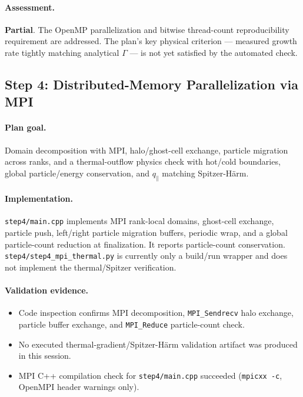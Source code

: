 \documentclass[11pt,a4paper]{article}
\begin{document}
\paragraph{Assessment.}
\textbf{Partial}. The OpenMP parallelization and bitwise thread-count reproducibility requirement are addressed. The plan's key physical criterion --- measured growth rate tightly matching analytical $\Gamma$ --- is not yet satisfied by the automated check.

\subsection{Step 4: Distributed-Memory Parallelization via MPI}

\paragraph{Plan goal.}
Domain decomposition with MPI, halo/ghost-cell exchange, particle migration across ranks, and a thermal-outflow physics check with hot/cold boundaries, global particle/energy conservation, and $q_\parallel$ matching Spitzer-H\"arm.

\paragraph{Implementation.}
\texttt{step4/main.cpp} implements MPI rank-local domains, ghost-cell exchange, particle push, left/right particle migration buffers, periodic wrap, and a global particle-count reduction at finalization. It reports particle-count conservation. \texttt{step4/step4\_mpi\_thermal.py} is currently only a build/run wrapper and does not implement the thermal/Spitzer verification.

\paragraph{Validation evidence.}
\begin{itemize}[leftmargin=*]
  \item Code inspection confirms MPI decomposition, \texttt{MPI\_Sendrecv} halo exchange, particle buffer exchange, and \texttt{MPI\_Reduce} particle-count check.
  \item No executed thermal-gradient/Spitzer-H\"arm validation artifact was produced in this session.
  \item MPI C++ compilation check for \texttt{step4/main.cpp} succeeded (\texttt{mpicxx -c}, OpenMPI header warnings only).
\end{itemize}
\end{document}
